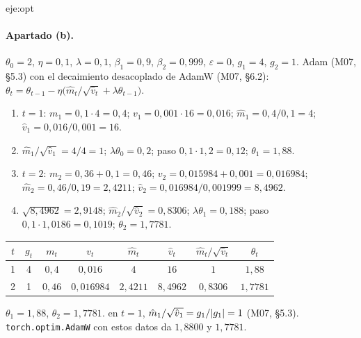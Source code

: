 \begin{solucion}{eje:opt}
\paragraph{Apartado (b).}
\datos $\theta_0=2$, $\eta=0{,}1$, $\lambda=0{,}1$, $\beta_1=0{,}9$, $\beta_2=0{,}999$, $\varepsilon=0$, $g_1=4$, $g_2=1$.
\planteamiento Adam (M07, §5.3) con el decaimiento desacoplado de AdamW (M07, §6.2): $\theta_t=\theta_{t-1}-\eta\bigl(\hat m_t/\sqrt{\hat v_t}+\lambda\theta_{t-1}\bigr)$.
\pasos
\begin{enumerate}[label=\arabic*.]
  \item $t=1$: $m_1=0{,}1\cdot 4=0{,}4$; $v_1=0{,}001\cdot 16=0{,}016$; $\hat m_1=0{,}4/0{,}1=4$; $\hat v_1=0{,}016/0{,}001=16$.
  \item $\hat m_1/\sqrt{\hat v_1}=4/4=1$; $\lambda\theta_0=0{,}2$; paso $0{,}1\cdot 1{,}2=0{,}12$; $\theta_1=1{,}88$.
  \item $t=2$: $m_2=0{,}36+0{,}1=0{,}46$; $v_2=0{,}015984+0{,}001=0{,}016984$; $\hat m_2=0{,}46/0{,}19=2{,}4211$; $\hat v_2=0{,}016984/0{,}001999=8{,}4962$.
  \item $\sqrt{8{,}4962}=2{,}9148$; $\hat m_2/\sqrt{\hat v_2}=0{,}8306$; $\lambda\theta_1=0{,}188$; paso $0{,}1\cdot 1{,}0186=0{,}1019$; $\theta_2=1{,}7781$.
\end{enumerate}
\begin{center}\small
\begin{tabular}{@{}cccccccc@{}}
\toprule
$t$ & $g_t$ & $m_t$ & $v_t$ & $\hat m_t$ & $\hat v_t$ & $\hat m_t/\sqrt{\hat v_t}$ & $\theta_t$ \\
\midrule
1 & 4 & $0{,}4$ & $0{,}016$ & $4$ & $16$ & $1$ & $1{,}88$ \\
2 & 1 & $0{,}46$ & $0{,}016984$ & $2{,}4211$ & $8{,}4962$ & $0{,}8306$ & $1{,}7781$ \\
\bottomrule
\end{tabular}
\end{center}
\resultado $\theta_1=1{,}88$, $\theta_2=1{,}7781$.
\comprobacion en $t=1$, $\hat m_1/\sqrt{\hat v_1}=g_1/\lvert g_1\rvert=1$ (M07, §5.3). \texttt{torch.optim.AdamW} con estos datos da $1{,}8800$ y $1{,}7781$.


\end{solucion}
